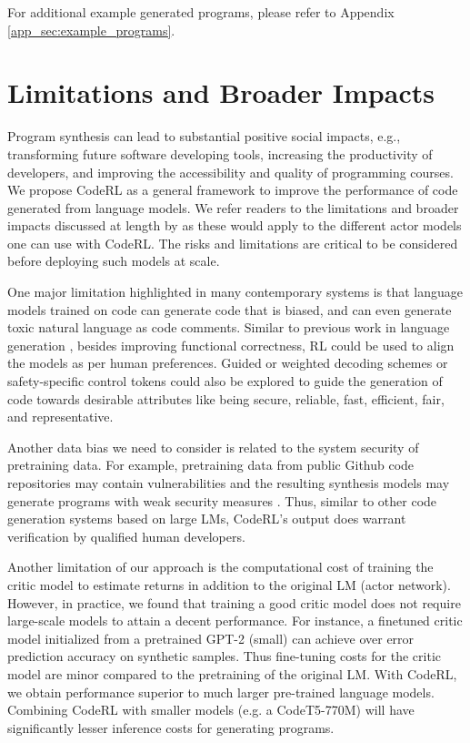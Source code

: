 \documentclass{article}
\begin{document}
For additional example generated programs, please refer to Appendix \ref{app_sec:example_programs}. 

 
\section{Limitations and Broader Impacts}\label{sec:limitation}
Program synthesis can lead to substantial positive social impacts, e.g., transforming future software developing tools, increasing the productivity of developers, and improving the accessibility and quality of programming courses. We propose CodeRL as a general framework to improve the performance of code generated from language models. We refer readers to the limitations and broader impacts discussed at length by \cite{chen2021evaluating} as these would apply to the different actor models one can use with CodeRL. The risks and limitations are critical to be considered before deploying such models at scale. 

One major limitation highlighted in many contemporary systems is that language models trained on code can generate code that is biased, and can even generate toxic natural language as code comments. Similar to previous work in language generation \citep{ouyang2022training}, besides improving functional correctness, RL could be used to align the models as per human preferences. Guided or weighted decoding schemes \citep{krause2020gedi} or safety-specific control tokens \citep{xu2020recipes} could also be explored to guide the generation of code towards desirable attributes like being secure, reliable, fast, efficient, fair, and representative.


Another data bias we need to consider is related to the system security of pretraining data. 
For example, pretraining data from public Github code repositories may contain vulnerabilities and the resulting synthesis models may generate programs with weak security measures \citep{hammond2021empirical}. Thus, similar to other code generation systems based on large LMs, CodeRL's output does warrant verification by qualified human developers.



Another limitation of our approach is the computational cost of training the critic model to estimate returns in addition to the original LM (actor network). However, in practice, we found that training a good critic model does not require large-scale models to attain a decent performance. For instance, a finetuned critic model initialized from a pretrained GPT-2 (small) can achieve over  error prediction accuracy on synthetic samples. Thus fine-tuning costs for the critic model are minor compared to the pretraining of the original LM. With CodeRL, we obtain performance superior to much larger pre-trained language models.
Combining CodeRL with smaller models (e.g. a CodeT5-770M) will have significantly lesser inference costs for generating programs.  
\end{document}
